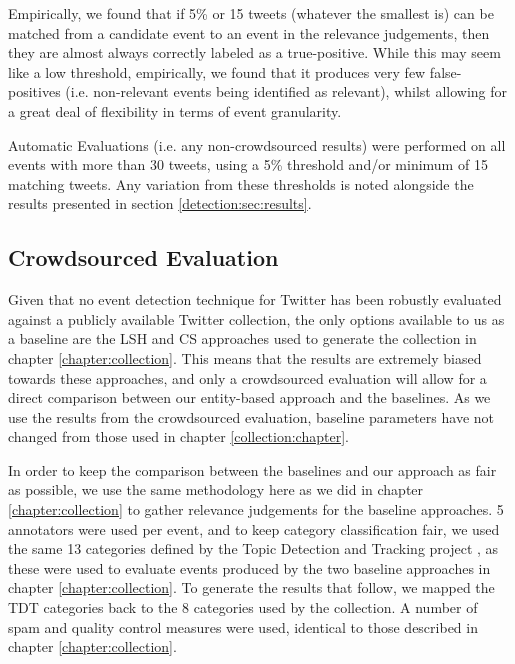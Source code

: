 Empirically, we found that if 5\% or 15 tweets (whatever the smallest is) can be matched from a candidate event to an event in the relevance judgements, then they are almost always correctly labeled as a true-positive.
While this may seem like a low threshold, empirically, we found that it produces very few false-positives (i.e. non-relevant events being identified as relevant), whilst allowing for a great deal of flexibility in terms of event granularity.

Automatic Evaluations (i.e. any non-crowdsourced results) were performed on all events with more than 30 tweets, using a 5\% threshold and/or minimum of 15 matching tweets.
Any variation from these thresholds is noted alongside the results presented in section \ref{detection:sec:results}.

\subsection{Crowdsourced Evaluation}
\label{sec:baseline}
Given that no event detection technique for Twitter has been robustly evaluated against a publicly available Twitter collection, the only options available to us as a baseline are the LSH \citep{Petrovic10} and CS \citep{Aggarwal12} approaches used to generate the collection in chapter \ref{chapter:collection}.
This means that the results are extremely biased towards these approaches, and only a crowdsourced evaluation will allow for a direct comparison between our entity-based approach and the baselines.
As we use the results from the crowdsourced evaluation, baseline parameters have not changed from those used in chapter \ref{collection:chapter}.

\label{detection:sec:crowd}
In order to keep the comparison between the baselines and our approach as fair as possible, we use the same methodology here as we did in chapter \ref{chapter:collection} to gather relevance judgements for the baseline approaches.
5 annotators were used per event, and to keep category classification fair, we used the same 13 categories defined by the Topic Detection and Tracking project \citep{Allan:2002:ITD:772260.772262}, as these were used to evaluate events produced by the two baseline approaches in chapter \ref{chapter:collection}.
To generate the results that follow, we mapped the TDT categories back to the 8 categories used by the collection.
A number of spam and quality control measures were used, identical to those described in chapter \ref{chapter:collection}.

